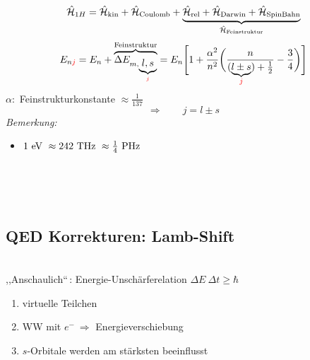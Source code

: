 \begin{equation*}
\hat{\mathcal{H}}_{1 H} = \hat{\mathcal{H}}_{\textrm{kin}} + \hat{\mathcal{H}}_{\textrm{Coulomb}} + \underbrace{\hat{\mathcal{H}}_{\textrm{rel}} + \hat{\mathcal{H}}_{\textrm{Darwin}} + \hat{\mathcal{H}}_{\textrm{SpinBahn}}}_{\hat{\mathcal{H}}_{\textrm{Feinstruktur}}}
\end{equation*}
%
%
%
%
%
%
\begin{equation*}
E_{n \color{red} j \color{black}} = E_n + \overbrace{\Delta E_{m, \underbrace{l, s}_{\color{red} j \color{black}}}}^{\textrm{Feinstruktur}} = E_n \Bigg[1 + \frac{\alpha^2}{n^2} \bigg(\frac{n}{(\underbrace{l \pm s}_{\color{red} j \color{black}}) + \frac{1}{2}} - \frac{3}{4}\bigg)\Bigg]
\end{equation*}
$ \alpha : $ Feinstrukturkonstante $ \approx \frac{1}{137} $
\begin{equation*}
\Rightarrow \qquad j = l \pm s
\end{equation*}
\emph{Bemerkung:}
\begin{itemize}
	\item $ 1 \textrm{ eV } \approx 242 \textrm{ THz } \approx \frac{1}{4} \textrm{ PHz } $
\end{itemize}
\\
\\
\\

\subsection{QED Korrekturen: Lamb-Shift}

\\
,,Anschaulich``\,: Energie-Unschärferelation $ \Delta E \ \Delta t \ge \hbar $\\
\begin{enumerate}[$ \Rightarrow $]
	\item virtuelle Teilchen
	\item WW mit $ e^- \ \Rightarrow $ Energieverschiebung
	\item $ s $-Orbitale werden am stärksten beeinflusst
\end{enumerate}

